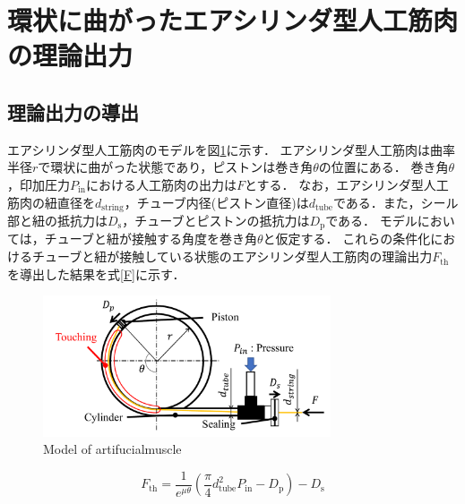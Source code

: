 \section{環状に曲がったエアシリンダ型人工筋肉の理論出力}%
\subsection{理論出力の導出}%
エアシリンダ型人工筋肉のモデルを図\ref{Model of artifucialmuscle}に示す．
エアシリンダ型人工筋肉は曲率半径$r$で環状に曲がった状態であり，ピストンは巻き角$\theta$の位置にある．
巻き角$\theta$，印加圧力$P_\mathrm{in}$における人工筋肉の出力は$F$とする．
なお，エアシリンダ型人工筋肉の紐直径を$d_\mathrm{string}$，チューブ内径(ピストン直径)は$d_\mathrm{tube}$である．また，シール部と紐の抵抗力は$D_\mathrm{s}$，チューブとピストンの抵抗力は$D_\mathrm{p}$である．
モデルにおいては，チューブと紐が接触する角度を巻き角$\theta$と仮定する．
これらの条件化におけるチューブと紐が接触している状態のエアシリンダ型人工筋肉の理論出力$F_\mathrm{th}$を導出した結果を式\eqref{F}に示す．
\begin{figure}[t]
  \centering
  \includegraphics[width=85mm]{_pdf/model_artifucialmuscle.pdf}
  \caption{Model of artifucialmuscle}
  \label{Model of artifucialmuscle}
\end{figure}

\begin{equation}
  \label{F}
  F_\mathrm{th}=\frac{1}{e^{\mu\theta}} (\frac{π}{4}d_\mathrm{tube}^2 P_\mathrm{in}-D_\mathrm{p} )-D_\mathrm{s}
\end{equation}

